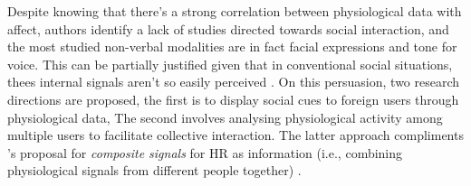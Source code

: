 Despite knowing that there's a strong correlation between physiological data with affect, authors identify a lack of studies directed towards social interaction, and the most studied non-verbal modalities are in fact facial expressions and tone for voice. This can be partially justified given that in conventional social situations, thees internal signals aren't so easily perceived \cite{vinciarelli_social_2009}. On this persuasion, two research directions are proposed, the first is to display social cues to foreign users through physiological data, The second involves analysing physiological activity among multiple users to facilitate collective interaction. The latter approach compliments \citeauthor{slovak_understanding_2012}'s proposal for \textit{composite signals} for HR as information (i.e., combining physiological signals from different people together) \cite{slovak_understanding_2012}.







